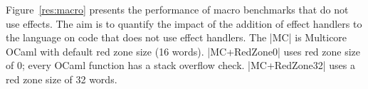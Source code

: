 \documentclass[sigplan,10pt,review,anonymous]{acmart}\settopmatter{printfolios=true,printccs=false,printacmref=false}
\begin{document}
Figure~\ref{res:macro} presents the performance of macro benchmarks that do not
use effects. The aim is to quantify the impact of the addition of effect
handlers to the language on code that does not use effect handlers. The |MC| is
Multicore OCaml with default red zone size (16 words). |MC+RedZone0| uses red
zone size of 0; every OCaml function has a stack overflow check. |MC+RedZone32|
uses a red zone size of 32 words.
\end{document}

